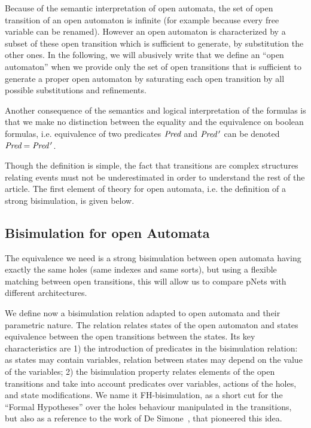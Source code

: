 \documentclass{lmcs}
\newcommand{\LUDO}[1]{\textcolor{darkgreen}{#1}}
\begin{document}
Because of the semantic interpretation of open automata, the set of open transition of an open automaton is infinite (for example because every free variable can be renamed). However an open automaton is characterized by a  subset of these open transition which is sufficient to generate, by substitution the other ones. In the following, we will abusively write that we define an ``open automaton'' when we provide only the set of open transitions that is sufficient to generate a proper open automaton by saturating each open transition by all possible substitutions and refinements.

Another consequence of the semantics and logical interpretation of the
formulas is that we make no distinction between the equality and the
equivalence on boolean formulas, i.e. equivalence of two predicates
$\Pred$ and $\Pred\,'$ can be denoted $\Pred=\Pred\,'$. 

	
Though the definition is simple, the fact that transitions are complex structures relating events must not be underestimated in order to understand the rest of the article. The first element of theory for open automata, i.e. the definition of a strong bisimulation, is given below.


\subsection{Bisimulation for open Automata}
\label{section:bisimulation}


The equivalence we need is a strong bisimulation between
open automata having exactly the same holes (same indexes and same sorts), but using a
flexible matching 
between open transitions, this will allow us to compare pNets
with different architectures.



We define now a bisimulation relation adapted to open automata and their parametric nature. The relation relates states of the open automaton and states equivalence between the open transitions between the states. Its key characteristics are 1) the introduction of predicates in the bisimulation relation: as states may contain variables, relation between states may depend on the value of the variables; 2) the bisimulation property relates elements of the open transitions and take into account predicates over variables, actions of the holes, and state modifications.
 We name it FH-bisimulation,
 as a short cut for the ``Formal Hypotheses'' over the holes behaviour manipulated in the
 transitions, but also as a reference to the work of De Simone~\cite{deSimone85},
 that pioneered this idea.
\end{document}
